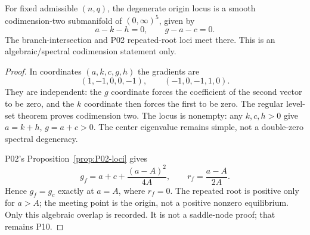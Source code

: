 \begin{proposition}
\label{prop:P09-codimension}
For fixed admissible $(n,q)$, the degenerate origin locus is a smooth
codimension-two submanifold of $(0,\infty)^5$, given by
\begin{equation}
 a-k-h=0,\qquad g-a-c=0.\label{eq:P09-degenerate-locus}
\end{equation}
The branch-intersection and P02 repeated-root loci meet there.
This is an algebraic/spectral codimension statement only.
\end{proposition}
\begin{proof}
In coordinates $(a,k,c,g,h)$ the gradients are
\[
 (1,-1,0,0,-1),\qquad(-1,0,-1,1,0).
\]
They are independent: the $g$ coordinate forces the coefficient of
the second vector to be zero, and the $k$ coordinate then forces the
first to be zero. The regular level-set theorem proves codimension two.
The locus is nonempty: any $k,c,h>0$ give $a=k+h$, $g=a+c>0$.
The center eigenvalue remains simple, not a double-zero spectral
 degeneracy.

P02's Proposition~\ref{prop:P02-loci} gives
\[
 g_f=a+c+\frac{(a-A)^2}{4A},\qquad r_f=\frac{a-A}{2A}.
\]
Hence $g_f=g_c$ exactly at $a=A$, where $r_f=0$.
The repeated root is positive only for $a>A$; the meeting point is
the origin, not a positive nonzero equilibrium. Only this algebraic
overlap is recorded. It is not a saddle-node proof; that remains P10.
\end{proof}

